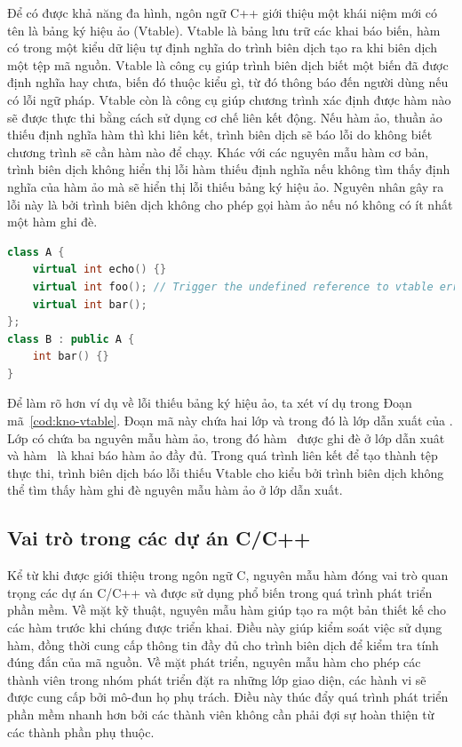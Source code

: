 Để có được khả năng đa hình, ngôn ngữ C++ giới thiệu một khái niệm mới có tên là bảng ký hiệu ảo (Vtable). Vtable là bảng lưu trữ các khai báo biến, hàm có trong một kiểu dữ liệu tự định nghĩa do trình biên dịch tạo ra khi biên dịch một tệp mã nguồn. Vtable là công cụ giúp trình biên dịch biết một biến đã được định nghĩa hay chưa, biến đó thuộc kiểu gì, từ đó thông báo đến người dùng nếu có lỗi ngữ pháp. Vtable còn là công cụ giúp chương trình xác định được hàm nào sẽ được thực thi bằng cách sử dụng cơ chế liên kết động. Nếu hàm ảo, thuần ảo thiếu định nghĩa hàm thì khi liên kết, trình biên dịch sẽ báo lỗi do không biết chương trình sẽ cần hàm nào để chạy. Khác với các nguyên mẫu hàm cơ bản, trình biên dịch không hiển thị lỗi hàm thiếu định nghĩa nếu không tìm thấy định nghĩa của hàm ảo mà sẽ hiển thị lỗi thiếu bảng ký hiệu ảo. Nguyên nhân gây ra lỗi này là bởi trình biên dịch không cho phép gọi hàm ảo nếu nó không có ít nhất một hàm ghi đè.\\

\begin{lstlisting}[language=C++, captionpos=b, caption={Ví dụ về lỗi thiếu bảng ký hiệu ảo.}, label={cod:kno-vtable}]
class A {
	virtual int echo() {}
	virtual int foo(); // Trigger the undefined reference to vtable error
	virtual int bar();
};
class B : public A {
	int bar() {}
}
\end{lstlisting}

Để làm rõ hơn ví dụ về lỗi thiếu bảng ký hiệu ảo, ta xét ví dụ trong Đoạn mã~\ref{cod:kno-vtable}. Đoạn mã này chứa hai lớp  và  trong đó  là lớp dẫn xuất của . Lớp  có chứa ba nguyên mẫu hàm ảo, trong đó hàm~ được ghi đè ở lớp dẫn xuât và hàm~ là khai báo hàm ảo đầy đủ. Trong quá trình liên kết để tạo thành tệp thực thi, trình biên dịch báo lỗi thiếu Vtable cho kiểu  bởi trình biên dịch không thể tìm thấy hàm ghi đè nguyên mẫu hàm ảo  ở lớp dẫn xuất.

\subsection{Vai trò trong các dự án C/C++}
Kể từ khi được giới thiệu trong ngôn ngữ C, nguyên mẫu hàm đóng vai trò quan trọng các dự án C/C++ và được sử dụng phổ biến trong quá trình phát triển phần mềm.	Về mặt kỹ thuật, nguyên mẫu hàm giúp tạo ra một bản thiết kế cho các hàm trước khi chúng được triển khai. Điều này giúp kiểm soát việc sử dụng hàm, đồng thời cung cấp thông tin đầy đủ cho trình biên dịch để kiểm tra tính đúng đắn của mã nguồn. Về mặt phát triển, nguyên mẫu hàm cho phép các thành viên trong nhóm phát triển đặt ra những lớp giao diện, các hành vi sẽ được cung cấp bởi mô-đun họ phụ trách. Điều này thúc đẩy quá trình phát triển phần mềm nhanh hơn bởi các thành viên không cần phải đợi sự hoàn thiện từ các thành phần phụ thuộc. 

